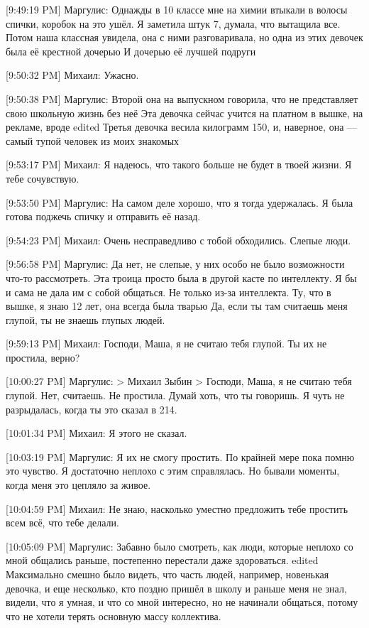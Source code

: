 \documentclass{article}
\begin{document}
[9:49:19 PM] Маргулис:
Однажды в 10 классе мне на химии втыкали в волосы спички, коробок на это ушёл. Я заметила штук 7, думала, что вытащила все.
 Потом наша классная увидела, она с ними разговаривала, но одна из этих девочек была её крестной дочерью
 И дочерью её лучшей подруги


[9:50:32 PM] Михаил:
Ужасно.

[9:50:38 PM] Маргулис:
Второй она на выпускном говорила, что не представляет свою школьную жизнь без неё
 Эта девочка сейчас учится на платном в вышке, на рекламе, вроде
edited 
Третья девочка весила килограмм 150, и, наверное, она — самый тупой человек из моих знакомых

[9:53:17 PM] Михаил:
Я надеюсь, что такого больше не будет в твоей жизни.
 Я тебе сочувствую.

[9:53:50 PM] Маргулис:
На самом деле хорошо, что я тогда удержалась. Я была готова поджечь спичку и отправить её назад.

[9:54:23 PM] Михаил:
Очень несправедливо с тобой обходились.
 Слепые люди.

[9:56:58 PM] Маргулис:
Да нет, не слепые, у них особо не было возможности что-то рассмотреть. Эта троица просто была в другой касте по интеллекту. Я бы и сама не дала им с собой общаться.
 Не только из-за интеллекта. Ту, что в вышке, я знаю 12 лет, она всегда была тварью
 Да, если ты там считаешь меня глупой, ты не знаешь глупых людей.

[9:59:13 PM] Михаил:
Господи, Маша, я не считаю тебя глупой.
 Ты их не простила, верно?

[10:00:27 PM] Маргулис:
> Михаил Зыбин
> Господи, Маша, я не считаю тебя глупой.
Нет, считаешь.
 Не простила.
 Думай хоть, что ты говоришь. Я чуть не разрыдалась, когда ты это сказал в 214.

[10:01:34 PM] Михаил:
Я этого не сказал.

[10:03:19 PM] Маргулис:
Я их не смогу простить. По крайней мере пока помню это чувство.
 Я достаточно неплохо с этим справлялась. Но бывали моменты, когда меня это цепляло за живое.
 
[10:04:59 PM] Михаил:
Не знаю, насколько уместно предложить тебе простить всем всё, что тебе делали.

[10:05:09 PM] Маргулис:
Забавно было смотреть, как люди, которые неплохо со мной общались раньше, постепенно перестали даже здороваться.
edited 
Максимально смешно было видеть, что часть людей, например, новенькая девочка, и еще несколько, кто поздно пришёл в школу и раньше меня не знал, видели, что я умная, и что со мной интересно, но не начинали общаться, потому что не хотели терять основную массу коллектива.
\end{document}
